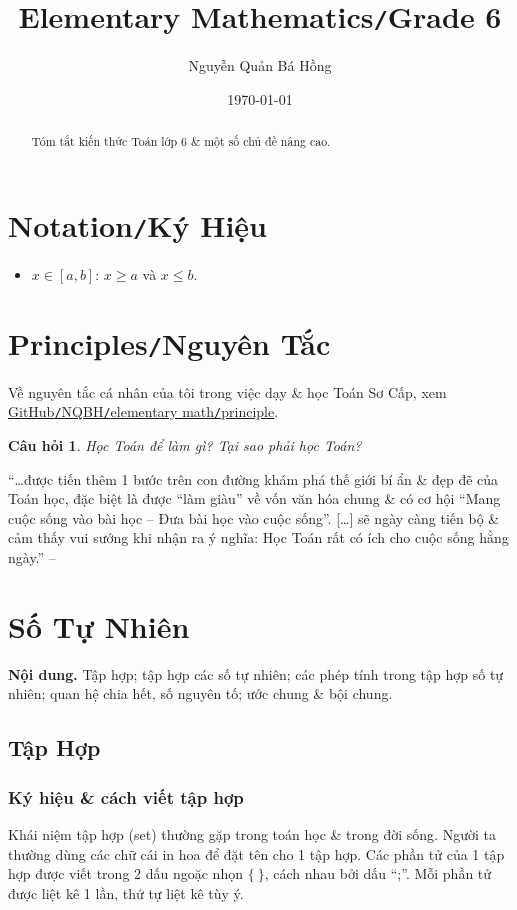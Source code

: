 \documentclass{article}
\title{Elementary Mathematics\texttt{/}Grade 6}
\author{Nguyễn Quản Bá Hồng}
\date{\today}
\numberwithin{equation}{section}
\newtheorem{question}{Câu hỏi}[section]
\begin{document}
\maketitle
\begin{abstract}
	Tóm tắt kiến thức Toán lớp 6 \& một số chủ đề nâng cao.
\end{abstract}
\tableofcontents


\section*{Notation\texttt{/}Ký Hiệu}
\begin{itemize}
	\item $x\in[a,b]$: $x\ge a$ và $x\le b$.
\end{itemize}

\section*{Principles\texttt{/}Nguyên Tắc}
Về nguyên tắc cá nhân của tôi trong việc dạy \& học Toán Sơ Cấp, xem \href{https://github.com/NQBH/hobby/tree/master/elementary_math/principle}{GitHub\texttt{/}NQBH\texttt{/}elementary math\texttt{/}principle}.

\begin{question}
	Học Toán để làm gì? Tại sao phải học Toán?
\end{question}
``\ldots được tiến thêm 1 bước trên con đường khám phá thế giới bí ẩn \& đẹp đẽ của Toán học, đặc biệt là được ``làm giàu'' về vốn văn hóa chung \& có cơ hội ``Mang cuộc sống vào bài học -- Đưa bài học vào cuộc sống''. [\ldots] sẽ ngày càng tiến bộ \& cảm thấy vui sướng khi nhận ra ý nghĩa: Học Toán rất có ích cho cuộc sống hằng ngày.'' -- \cite{Toan6}

\section{Số Tự Nhiên}
\textbf{Nội dung.} Tập hợp; tập hợp các số tự nhiên; các phép tính trong tập hợp số tự nhiên; quan hệ chia hết, số nguyên tố; ước chung \& bội chung.

\subsection{Tập Hợp}

\subsubsection{Ký hiệu \& cách viết tập hợp}
Khái niệm tập hợp (set) thường gặp trong toán học \& trong đời sống. Người ta thường dùng các chữ cái in hoa để đặt tên cho 1 tập hợp. Các phần tử của 1 tập hợp được viết trong 2 dấu ngoặc nhọn $\{\ \}$, cách nhau bởi dấu ``;''. Mỗi phần tử được liệt kê 1 lần, thứ tự liệt kê tùy ý.
\end{document}
